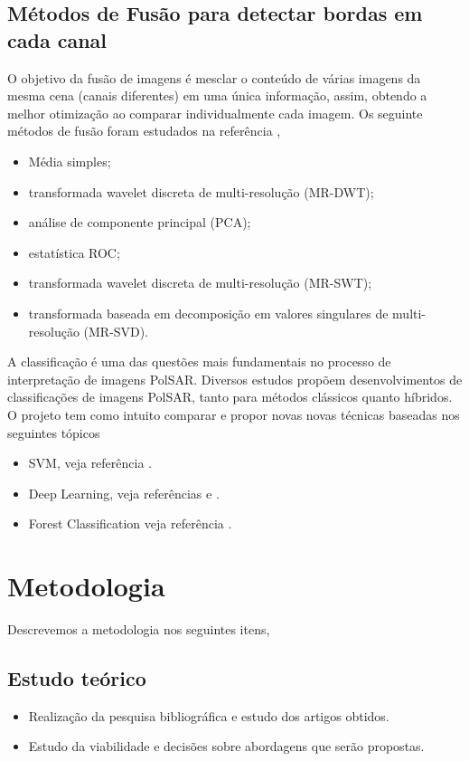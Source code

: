 \documentclass[runningheads]{llncs}
\begin{document}
\subsection{Métodos de Fusão para detectar bordas em cada canal}
 O objetivo da fusão de imagens é mesclar o conteúdo de várias imagens da mesma cena (canais diferentes) em uma única informação, assim, obtendo a melhor otimização ao comparar individualmente cada imagem. Os seguinte métodos de fusão foram estudados na referência \cite{bmf_2020},
\begin{itemize}
  \item Média simples;
  \item transformada wavelet discreta de multi-resolução (MR-DWT);
  \item análise de componente principal (PCA);
  \item estatística ROC;
  \item transformada wavelet discreta de multi-resolução (MR-SWT);
  \item transformada baseada em decomposição em valores singulares de multi-resolução (MR-SVD).
\end{itemize}

A classificação é uma das questões mais fundamentais no
processo de interpretação de imagens PolSAR. Diversos estudos propõem desenvolvimentos de classificações de imagens PolSAR, tanto para métodos clássicos quanto híbridos. O projeto tem como intuito comparar e propor novas novas técnicas baseadas nos seguintes tópicos 
\begin{itemize}
  \item SVM, veja referência \cite{ref_proc1}.
  \item Deep Learning, veja referências \cite{ref_proc3} e \cite{ztmxzxf}.
  \item Forest Classification veja referência \cite{ref_proc1}.
\end{itemize}

\section{Metodologia}
Descrevemos a metodologia nos seguintes itens,
\subsection{Estudo teórico}
\begin{itemize}
  \item Realização da pesquisa bibliográfica e estudo dos artigos obtidos.
  \item Estudo da viabilidade e decisões sobre abordagens que serão propostas.
\end{itemize}
\end{document}
